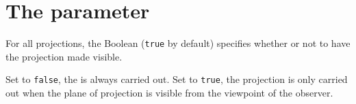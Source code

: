 \section{The parameter \texttt{}}

For all projections, the Boolean 
(\verb+true+ by default) specifies whether or not to have the
projection made visible.

Set to \verb+false+, the  is always carried out. Set to
\verb+true+, the projection is only carried out when the plane of
projection is visible from the viewpoint of the observer.

\endinput
